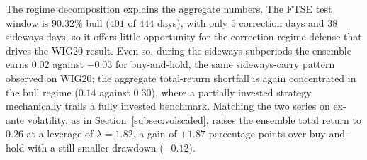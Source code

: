 \documentclass{ieeeaccess}
\newcommand{\FtseOOSDays}{\ensuremath{444}}
\newcommand{\FtseLeverage}{\ensuremath{1.82}}
\newcommand{\FtseVolScaledTR}{\ensuremath{0.26}}
\newcommand{\FtseVolScaledMDD}{\ensuremath{-0.12}}
\newcommand{\FtseVolScaledExcessPP}{\ensuremath{+1.87}}
\newcommand{\FtseRegBullShare}{90.32\%}
\newcommand{\FtseRegBullDays}{\ensuremath{401}}
\newcommand{\FtseRegCorrectionDays}{\ensuremath{5}}
\newcommand{\FtseRegSidewaysDays}{\ensuremath{38}}
\newcommand{\FtseEnsBullTR}{\ensuremath{0.14}}
\newcommand{\FtseBHBullTR}{\ensuremath{0.30}}
\newcommand{\FtseEnsSidewaysTR}{\ensuremath{0.02}}
\newcommand{\FtseBHSidewaysTR}{\ensuremath{-0.03}}
\begin{document}
The regime decomposition explains the aggregate numbers. The FTSE test window is $\FtseRegBullShare{}$ bull ($\FtseRegBullDays{}$ of \FtseOOSDays{} days), with only $\FtseRegCorrectionDays{}$ correction days and $\FtseRegSidewaysDays{}$ sideways days, so it offers little opportunity for the correction-regime defense that drives the WIG20 result. Even so, during the sideways subperiods the ensemble earns \FtseEnsSidewaysTR{} against \FtseBHSidewaysTR{} for buy-and-hold, the same sideways-carry pattern observed on WIG20; the aggregate total-return shortfall is again concentrated in the bull regime (\FtseEnsBullTR{} against \FtseBHBullTR{}), where a partially invested strategy mechanically trails a fully invested benchmark. Matching the two series on ex-ante volatility, as in Section~\ref{subsec:volscaled}, raises the ensemble total return to \FtseVolScaledTR{} at a leverage of $\lambda = \FtseLeverage{}$, a gain of \FtseVolScaledExcessPP{} percentage points over buy-and-hold with a still-smaller drawdown (\FtseVolScaledMDD{}).
\end{document}

